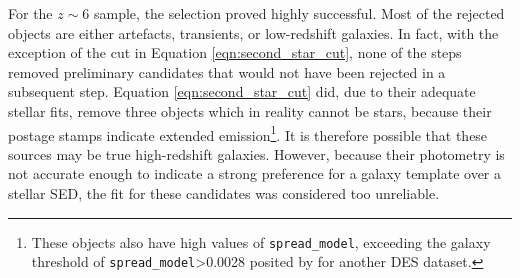 For the $z\sim6$ sample, the selection proved highly successful. Most of the rejected objects are either artefacts, transients, or low-redshift galaxies. In fact, with the exception of the cut in Equation \ref{eqn:second_star_cut}, none of the steps removed preliminary candidates that would not have been rejected in a subsequent step. Equation \ref{eqn:second_star_cut} did, due to their adequate stellar fits, remove three objects which in reality cannot be stars, because their postage stamps indicate extended emission\footnote{These objects also have high values of \texttt{spread\_model}, exceeding the galaxy threshold of \texttt{spread\_model}>0.0028 posited by  \cite{2015MNRAS.446.2523B} for another DES dataset.}. It is therefore possible that these sources may be true high-redshift galaxies. However, because their photometry is not accurate enough to indicate a strong preference for a galaxy template over a stellar SED, the fit for these candidates was considered too unreliable. \par 


